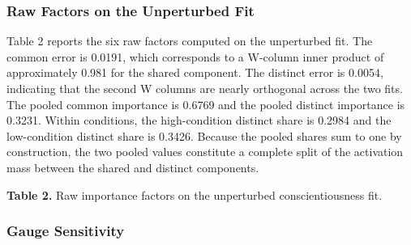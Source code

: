 \documentclass{article}
\begin{document}
\label{sec:results}

\subsubsection{Raw Factors on the Unperturbed Fit}

\label{sec:raw_factors_on_the_unperturbed_fit}

Table 2 reports the six raw factors computed on the unperturbed fit. The common error is 0.0191, which corresponds to a W-column inner product of approximately 0.981 for the shared component. The distinct error is 0.0054, indicating that the second W columns are nearly orthogonal across the two fits. The pooled common importance is 0.6769 and the pooled distinct importance is 0.3231. Within conditions, the high-condition distinct share is 0.2984 and the low-condition distinct share is 0.3426. Because the pooled shares sum to one by construction, the two pooled values constitute a complete split of the activation mass between the shared and distinct components.

\textbf{Table 2.} Raw importance factors on the unperturbed conscientiousness fit.

\begin{table}[ht]
\centering
\caption{Comparison of Factor across Definition, Value}
\label{tab:2}
\end{table}

\subsubsection{Gauge Sensitivity}

\label{sec:gauge_sensitivity}
\end{document}
